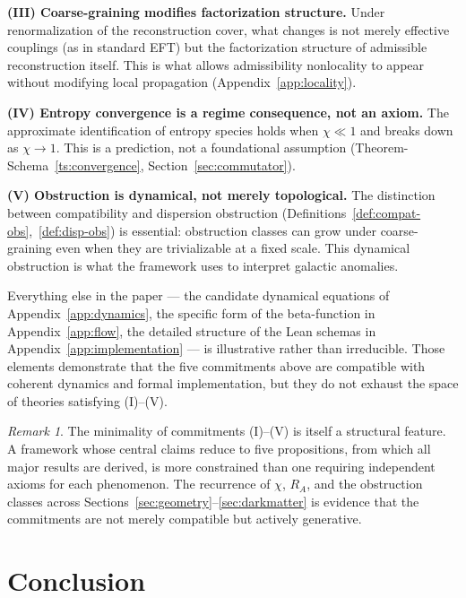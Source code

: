 \documentclass[11pt, a4paper]{article}
\theoremstyle{plain}
\theoremstyle{definition}
\theoremstyle{remark}
\newtheorem{remark}[theorem]{Remark}
\newcommand{\RA}{R_{\!A}}
\begin{document}
\medskip
\noindent\textbf{(III) Coarse-graining modifies factorization structure.}
Under renormalization of the reconstruction cover, what changes is not merely
effective couplings (as in standard EFT) but the factorization structure of admissible
reconstruction itself. This is what allows admissibility nonlocality to appear without
modifying local propagation (Appendix~\ref{app:locality}).

\medskip
\noindent\textbf{(IV) Entropy convergence is a regime consequence, not an axiom.}
The approximate identification of entropy species holds when $\chi \ll 1$ and breaks
down as $\chi \to 1$. This is a prediction, not a foundational assumption
(Theorem-Schema~\ref{ts:convergence}, Section~\ref{sec:commutator}).

\medskip
\noindent\textbf{(V) Obstruction is dynamical, not merely topological.}
The distinction between compatibility and dispersion obstruction
(Definitions~\ref{def:compat-obs},~\ref{def:disp-obs}) is essential: obstruction
classes can grow under coarse-graining even when they are trivializable at a fixed
scale. This dynamical obstruction is what the framework uses to interpret galactic
anomalies.

\medskip
Everything else in the paper --- the candidate dynamical equations of
Appendix~\ref{app:dynamics}, the specific form of the beta-function in
Appendix~\ref{app:flow}, the detailed structure of the Lean schemas in
Appendix~\ref{app:implementation} --- is illustrative rather than irreducible. Those
elements demonstrate that the five commitments above are compatible with coherent
dynamics and formal implementation, but they do not exhaust the space of theories
satisfying (I)--(V).

\begin{remark}
The minimality of commitments (I)--(V) is itself a structural feature. A framework
whose central claims reduce to five propositions, from which all major results are
derived, is more constrained than one requiring independent axioms for each
phenomenon. The recurrence of $\chi$, $\RA$, and the obstruction classes across
Sections~\ref{sec:geometry}--\ref{sec:darkmatter} is evidence that the commitments
are not merely compatible but actively generative.
\end{remark}

\section{Conclusion}
\label{sec:conclusion}
\end{document}
